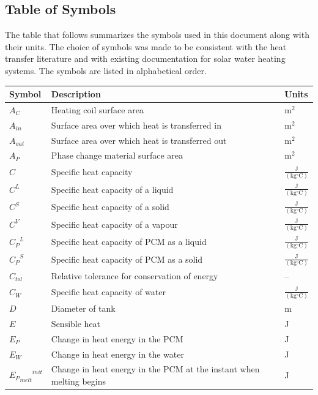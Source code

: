 \documentclass[12pt]{article}
\begin{document}
\subsection{Table of Symbols}
\label{Sec:ToS}
The table that follows summarizes the symbols used in this document along with their units. The choice of symbols was made to be consistent with the heat transfer literature and with existing documentation for solar water heating systems. The symbols are listed in alphabetical order.
\begin{longtabu}{l X[l] l}
\toprule
Symbol & Description & Units
\\
\midrule
\endhead
${A_{C}}$ & Heating coil surface area & $\text{m}^{2}$
\\
${A_{in}}$ & Surface area over which heat is transferred in & $\text{m}^{2}$
\\
${A_{out}}$ & Surface area over which heat is transferred out & $\text{m}^{2}$
\\
${A_{P}}$ & Phase change material surface area & $\text{m}^{2}$
\\
$C$ & Specific heat capacity & $\frac{\text{J}}{(\text{kg}{}^{\circ}\text{C})}$
\\
${C^{L}}$ & Specific heat capacity of a liquid & $\frac{\text{J}}{(\text{kg}{}^{\circ}\text{C})}$
\\
${C^{S}}$ & Specific heat capacity of a solid & $\frac{\text{J}}{(\text{kg}{}^{\circ}\text{C})}$
\\
${C^{V}}$ & Specific heat capacity of a vapour & $\frac{\text{J}}{(\text{kg}{}^{\circ}\text{C})}$
\\
${{C_{P}}^{L}}$ & Specific heat capacity of PCM as a liquid & $\frac{\text{J}}{(\text{kg}{}^{\circ}\text{C})}$
\\
${{C_{P}}^{S}}$ & Specific heat capacity of PCM as a solid & $\frac{\text{J}}{(\text{kg}{}^{\circ}\text{C})}$
\\
${C_{tol}}$ & Relative tolerance for conservation of energy & --
\\
${C_{W}}$ & Specific heat capacity of water & $\frac{\text{J}}{(\text{kg}{}^{\circ}\text{C})}$
\\
$D$ & Diameter of tank & m
\\
$E$ & Sensible heat & J
\\
${E_{P}}$ & Change in heat energy in the PCM & J
\\
${E_{W}}$ & Change in heat energy in the water & J
\\
${{{E_{P}}_{melt}}^{init}}$ & Change in heat energy in the PCM at the instant when melting begins & J

\end{longtabu}
\end{document}
